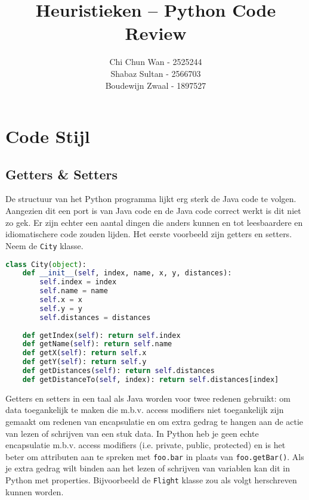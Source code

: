 \documentclass[a4paper]{article}
\author{Chi Chun Wan - 2525244\\
Shabaz Sultan - 2566703\\
Boudewijn Zwaal - 1897527}
\title{Heuristieken -- Python Code Review}
\begin{document}
\maketitle
\section{Code Stijl}
\subsection{Getters \& Setters}
De structuur van het Python programma lijkt erg sterk de Java code te volgen. Aangezien dit een port is van Java code en de Java code correct werkt is dit niet zo gek. Er zijn echter een aantal dingen die anders kunnen en tot leesbaardere en idiomatischere code zouden lijden. Het eerste voorbeeld zijn getters en setters. Neem de \verb!City! klasse.
\begin{lstlisting}[language=Python] 
class City(object):
    def __init__(self, index, name, x, y, distances):
        self.index = index
        self.name = name
        self.x = x
        self.y = y
        self.distances = distances
    
    def getIndex(self): return self.index
    def getName(self): return self.name
    def getX(self): return self.x
    def getY(self): return self.y
    def getDistances(self): return self.distances
    def getDistanceTo(self, index): return self.distances[index]
\end{lstlisting} 
Getters en setters in een taal als Java worden voor twee redenen gebruikt: om data toegankelijk te maken die m.b.v. access modifiers niet toegankelijk zijn gemaakt om redenen van encapsulatie en om extra gedrag te hangen aan de actie van lezen of schrijven van een stuk data. In Python heb je geen echte encapsulatie m.b.v. access modifiers (i.e. private, public, protected) en is het beter om attributen aan te spreken met \verb!foo.bar! in plaats van \verb!foo.getBar()!. Als je extra gedrag wilt binden aan het lezen of schrijven van variablen kan dit in Python met properties. Bijvoorbeeld de \verb!Flight! klasse zou als volgt herschreven kunnen worden.
\end{document}

